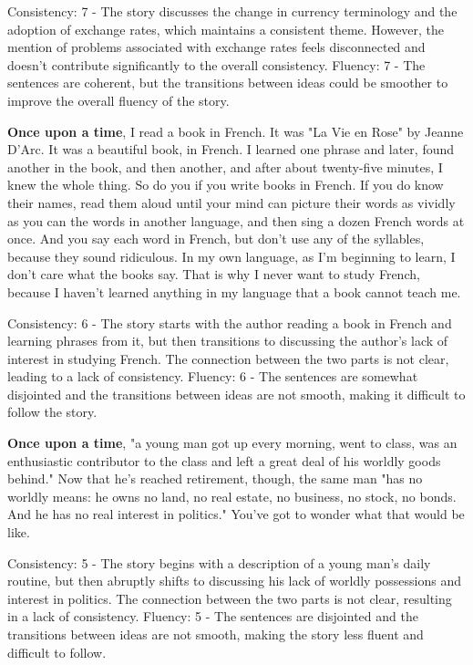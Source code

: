 \documentclass{article}
\begin{document}
Consistency: 7 - The story discusses the change in currency terminology and the adoption of exchange rates, which maintains a consistent theme. However, the mention of problems associated with exchange rates feels disconnected and doesn't contribute significantly to the overall consistency.
Fluency: 7 - The sentences are coherent, but the transitions between ideas could be smoother to improve the overall fluency of the story.

\textbf{Once upon a time}, I read a book in French. It was "La Vie en Rose" by Jeanne D'Arc. It was a beautiful book, in French. I learned one phrase and later, found another in the book, and then another, and after about twenty-five minutes, I knew the whole thing. So do you if you write books in French. If you do know their names, read them aloud until your mind can picture their words as vividly as you can the words in another language, and then sing a dozen French words at once. And you say each word in French, but don't use any of the syllables, because they sound ridiculous. In my own language, as I'm beginning to learn, I don't care what the books say. That is why I never want to study French, because I haven't learned anything in my language that a book cannot teach me.

Consistency: 6 - The story starts with the author reading a book in French and learning phrases from it, but then transitions to discussing the author's lack of interest in studying French. The connection between the two parts is not clear, leading to a lack of consistency.
Fluency: 6 - The sentences are somewhat disjointed and the transitions between ideas are not smooth, making it difficult to follow the story.

\textbf{Once upon a time}, "a young man got up every morning, went to class, was an enthusiastic contributor to the class and left a great deal of his worldly goods behind." Now that he's reached retirement, though, the same man "has no worldly means: he owns no land, no real estate, no business, no stock, no bonds. And he has no real interest in politics." You've got to wonder what that would be like.

Consistency: 5 - The story begins with a description of a young man's daily routine, but then abruptly shifts to discussing his lack of worldly possessions and interest in politics. The connection between the two parts is not clear, resulting in a lack of consistency.
Fluency: 5 - The sentences are disjointed and the transitions between ideas are not smooth, making the story less fluent and difficult to follow.
\end{document}
